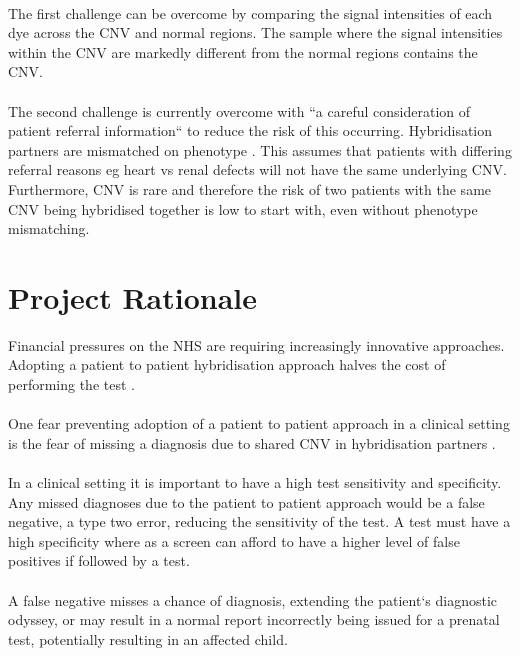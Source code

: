 \paragraph*{}
The first challenge can be overcome by comparing the signal intensities of each dye across the CNV and normal regions. The sample where the signal intensities within the CNV are markedly different from the normal regions contains the CNV.

\paragraph*{}
The second challenge is currently overcome with ``a careful consideration of patient referral information`` to reduce the risk of this occurring. Hybridisation partners are mismatched on phenotype \cite{ahn2010}. This assumes that patients with differing referral reasons eg heart vs renal defects will not have the same underlying CNV. Furthermore, CNV is rare and therefore the risk of two patients with the same CNV being hybridised together is low to start with, even without phenotype mismatching.

\section{Project Rationale}
Financial pressures on the NHS are requiring increasingly innovative approaches. Adopting a patient to patient hybridisation approach halves the cost of performing the test \cite{ahn2010}.
\paragraph*{}
One fear preventing adoption of a patient to patient approach in a clinical setting is the fear of missing a diagnosis due to shared CNV in hybridisation partners \cite{dunlop2015}. 
\paragraph*{}
In a clinical setting it is important to have a high test sensitivity and specificity. Any missed diagnoses due to the patient to patient approach would be a false negative, a type two error, reducing the sensitivity of the test.  A test must have a high specificity where as a screen can afford to have a higher level of false positives if followed by a test.
\paragraph*{}
A false negative misses a chance of diagnosis, extending the patient`s diagnostic odyssey, or may result in a normal report incorrectly being issued for a prenatal test, potentially resulting in an affected child. 
